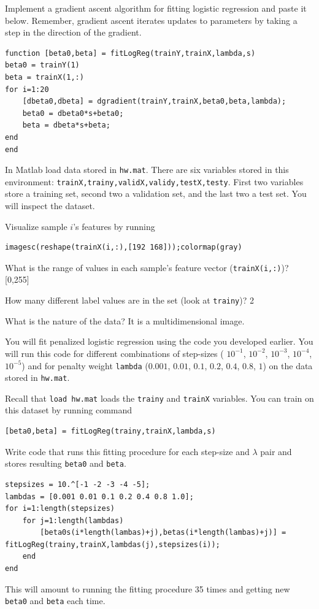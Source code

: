 \documentclass{article}
\begin{document}

\newproblem{2pt}
Implement a gradient ascent algorithm for fitting logistic regression and paste it below.
Remember, gradient ascent iterates updates to parameters by taking a step in the direction of the gradient.  
\begin{verbatim}
function [beta0,beta] = fitLogReg(trainY,trainX,lambda,s)
beta0 = trainY(1)
beta = trainX(1,:)
for i=1:20
    [dbeta0,dbeta] = dgradient(trainY,trainX,beta0,beta,lambda);
    beta0 = dbeta0*s+beta0;
    beta = dbeta*s+beta;
end
end
\end{verbatim}



\newproblem{1pt} In Matlab load data stored in \texttt{hw\theHW.mat}. There are six variables stored in this environment:
\texttt{trainX,trainy,validX,validy,testX,testy}. First two variables store a training set, second two a validation set, and the last two a test set.
You will inspect the dataset. 

Visualize sample $i$'s features by running 
\begin{verbatim}
imagesc(reshape(trainX(i,:),[192 168]));colormap(gray)
\end{verbatim}

What is the range of values in each sample's feature vector (\texttt{trainX(i,:)})? [0,255]

How many different label values are in the set (look at \texttt{trainy})? 2

What is the nature of the data? It is a multidimensional image.

\newproblem{2pt}
You will fit penalized logistic regression using the code you developed earlier. You will run this code for different combinations of step-sizes ( $10^{-1}$, $10^{-2}$, $10^{-3}$, $10^{-4}$, $10^{-5}$) and for penalty weight \texttt{lambda} ($0.001$, $0.01$, $0.1$, $0.2$, $0.4$, $0.8$, $1$) on the data stored in \texttt{hw\theHW.mat}.

Recall that \texttt{load hw\theHW.mat} loads the \texttt{trainy} and \texttt{trainX} variables.
You can train on this dataset by running command
\begin{verbatim}
[beta0,beta] = fitLogReg(trainy,trainX,lambda,s) 
\end{verbatim}

Write code that runs this fitting procedure for each step-size and $\lambda$ pair and stores resulting \texttt{beta0} and \texttt{beta}.
\begin{verbatim}
stepsizes = 10.^[-1 -2 -3 -4 -5];
lambdas = [0.001 0.01 0.1 0.2 0.4 0.8 1.0];
for i=1:length(stepsizes)
    for j=1:length(lambdas)
        [beta0s(i*length(lambas)+j),betas(i*length(lambas)+j)] = fitLogReg(trainy,trainX,lambdas(j),stepsizes(i));
    end
end
\end{verbatim}
This will amount to running the fitting procedure 35 times and getting new \texttt{beta0} and \texttt{beta} each time. 
\end{document}
